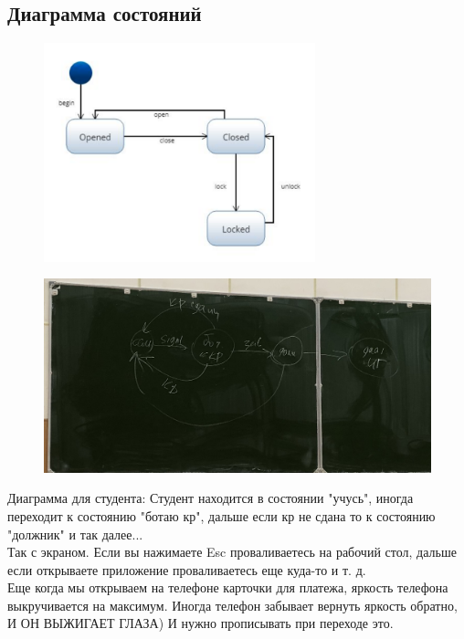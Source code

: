 \documentclass[12pt; a4paper]{book}
\theoremstyle{plain} %
\theoremstyle{defenition}
\theoremstyle{remark}
\begin{document}
\subsection{Диаграмма состояний}
\begin{figure}[!htbp]
\includegraphics[angle=0, width=0.7\textwidth]{IMG/4} \\
\end{figure}
\begin{figure}[!htbp]
\includegraphics[angle=0, width=\textwidth]{IMG/IMG_0820.jpg} \\
\end{figure}
Диаграмма для студента:
Студент находится в состоянии "учусь", иногда переходит к состоянию "ботаю кр", дальше если кр не сдана то к состоянию "должник" и так далее...\\

Так с экраном. Если вы нажимаете Esc проваливаетесь на рабочий стол, дальше если открываете приложение проваливаетесь еще куда-то и т. д. \\
Еще когда мы открываем на телефоне карточки для платежа, яркость телефона выкручивается на максимум. Иногда телефон забывает вернуть яркость обратно, И ОН ВЫЖИГАЕТ ГЛАЗА) И нужно прописывать при переходе это.
\end{document}
